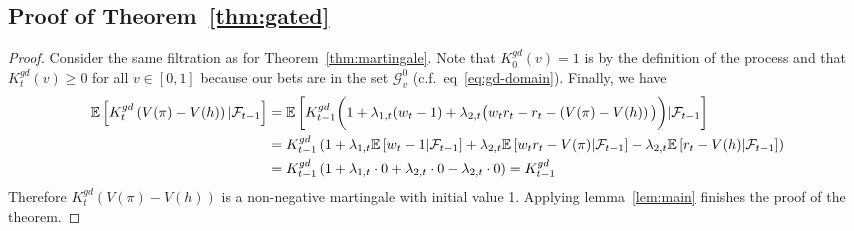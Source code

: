 \subsection{Proof of Theorem~\ref{thm:gated}}
\begin{proof}

Consider the same filtration as for Theorem~\ref{thm:martingale}.
Note that $K_0^{gd}(v)=1$ is by 
the definition of the process and that $K_t^{gd}(v)\geq 0$ for all 
$v \in [0,1]$ because our bets 
are in the set $\mathcal{G}_v^0$ (c.f.\ eq~\eqref{eq:gd-domain}).
Finally, we have
\begin{align*}
    \mathbb{E}\left[K_t^{gd}\left(V(\pi)-V(h)\right)|\mathcal{F}_{t-1}\right]
    &= \mathbb{E}\left[K_{t-1}^{gd}\bigg(1+\lambda_{1,t}(w_t-1)+\lambda_{2,t}
    \big(w_t r_t - r_t - \left(V(\pi)-V(h)\right)\big)\bigg)|\mathcal{F}_{t-1}\right]\\
    &= K_{t-1}^{gd}\left(1+\lambda_{1,t} \mathbb{E}\left[w_t-1|\mathcal{F}_{t-1}\right]
    +\lambda_{2,t}\mathbb{E}\left[w_t r_t - V(\pi)|\mathcal{F}_{t-1}\right]
    -\lambda_{2,t}\mathbb{E}\left[r_t - V(h)|\mathcal{F}_{t-1}\right]\right)\\
    &= K_{t-1}^{gd}\left(1+\lambda_{1,t} \cdot 0 + \lambda_{2,t} \cdot 0 - \lambda_{2,t} \cdot 0\right) = K_{t-1}^{gd}
\end{align*}
Therefore $K_t^{gd}(V(\pi)-V(h))$ is a non-negative martingale with initial
value 1. Applying 
lemma~\ref{lem:main} finishes the proof of the theorem.
\end{proof}

